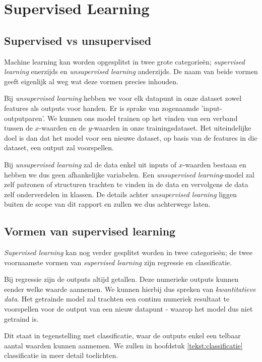 \documentclass[TeamE-eindrapport]{subfiles}
\begin{document}
	
	\chapter{Supervised Learning}
	
	\label{tekst:supervisedlearning}
	
	\section{Supervised vs unsupervised}
	
	Machine learning kan worden opgesplitst in twee grote categorieën; \textit{supervised learning} enerzijds en \textit{unsupervised learning} anderzijds. De naam van beide vormen geeft eigenlijk al weg wat deze vormen precies inhouden.
	
	Bij \textit{unsupervised learning} hebben we voor elk datapunt in onze dataset zowel features als outputs voor handen. Er is sprake van zogenaamde 'input-outputparen'. We kunnen ons model trainen op het vinden van een verband tussen de \(x\)-waarden en de \(y\)-waarden in onze trainingsdataset. Het uiteindelijke doel is dan dat het model voor een nieuwe dataset, op basis van de features in die dataset, een output zal voorspellen.
	
	Bij \textit{unsupervised learning} zal de data enkel uit inputs of \(x\)-waarden bestaan en hebben we dus geen afhankelijke variabelen. Een \textit{unsupervised learning}-model zal zelf patronen of structuren trachten te vinden in de data en vervolgens de data zelf onderverdelen in klassen. De details achter \emph{unsupervised learning} liggen buiten de scope van dit rapport en zullen we dus achterwege laten.
	
	\section{Vormen van supervised learning}
	
	\textit{Supervised learning} kan nog verder gesplitst worden in twee categorieën; de twee voornaamste vormen van \textit{supervised learning} zijn regressie en classificatie. 
	
	Bij regressie zijn de outputs altijd getallen. Deze numerieke outputs kunnen eender welke waarde aannemen. We kunnen hierbij dus spreken van \textit{kwantitatieve data}. Het getrainde model zal trachten een continu numeriek resultaat te voorspellen voor de output van een nieuw datapunt - waarop het model dus niet getraind is.
	
	Dit staat in tegenstelling met classificatie, waar de outputs enkel een telbaar aantal waarden kunnen aannemen. We zullen in hoofdstuk \ref{tekst:classificatie} classificatie in meer detail toelichten.
	
\end{document}

